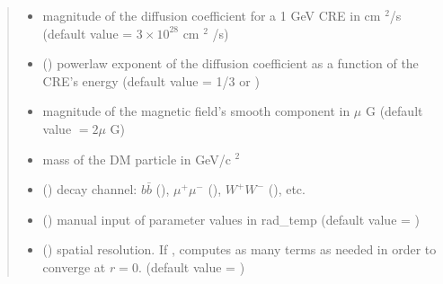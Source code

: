 \documentclass[letterpaper,10pt,english]{sphinxmanual}
\begin{document}
\begin{fulllineitems}
\begin{quote}
\begin{description}
\begin{itemize}
\item {} 
\sphinxAtStartPar
{} \textendash{} magnitude of the diffusion coefficient for a 1 GeV CRE in cm \({}^2\)/s (default value = \(3\times 10^{28}\) cm \({}^2\) /s)

\item {} 
\sphinxAtStartPar
{} (\sphinxstyleliteralemphasis{\sphinxupquote{, }}) \textendash{} power\sphinxhyphen{}law exponent of the diffusion coefficient as a function of the CRE’s energy (default value = 1/3 or )

\item {} 
\sphinxAtStartPar
{} \textendash{} magnitude of the magnetic field’s smooth component in \(\mu\) G (default value \(= 2 \mu\) G)

\item {} 
\sphinxAtStartPar
{} \textendash{} mass of the DM particle in GeV/c \({}^2\)

\item {} 
\sphinxAtStartPar
{} () \textendash{} decay channel: \(b\bar b\) (), \(\mu^+ \mu^-\) (), \(W^+ W^-\) (), etc.

\item {} 
\sphinxAtStartPar
{} () \textendash{} manual input of parameter values in rad\_temp (default value = )

\item {} 
\sphinxAtStartPar
{} () \textendash{} spatial resolution. If ,  computes as many terms as needed in order to converge at \(r=0\). (default value = )


\end{itemize}
\end{description}
\end{quote}
\end{fulllineitems}
\end{document}
